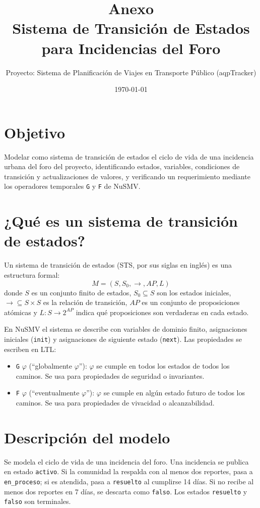 \documentclass[11pt,a4paper]{article}
\title{\textbf{Anexo}\\[2mm]
\large Sistema de Transición de Estados para Incidencias del Foro}
\author{Proyecto: Sistema de Planificación de Viajes en Transporte Público (aqpTracker)}
\date{\today}
\begin{document}
\maketitle

\section{Objetivo}

Modelar como sistema de transición de estados el ciclo de vida de una incidencia urbana del foro del proyecto, identificando estados, variables, condiciones de transición y actualizaciones de valores, y verificando un requerimiento mediante los operadores temporales \texttt{G} y \texttt{F} de NuSMV.

\section{¿Qué es un sistema de transición de estados?}

Un sistema de transición de estados (STS, por sus siglas en inglés) es una estructura formal:
\[
M = (S, S_0, \rightarrow, AP, L)
\]
donde \(S\) es un conjunto finito de estados, \(S_0 \subseteq S\) son los estados iniciales, \(\rightarrow \subseteq S \times S\) es la relación de transición, \(AP\) es un conjunto de proposiciones atómicas y \(L : S \rightarrow 2^{AP}\) indica qué proposiciones son verdaderas en cada estado.

En NuSMV el sistema se describe con variables de dominio finito, asignaciones iniciales (\texttt{init}) y asignaciones de siguiente estado (\texttt{next}). Las propiedades se escriben en LTL:
\begin{itemize}
  \item \texttt{G} \(\varphi\) (``globalmente \(\varphi\)''): \(\varphi\) se cumple en todos los estados de todos los caminos. Se usa para propiedades de seguridad o invariantes.
  \item \texttt{F} \(\varphi\) (``eventualmente \(\varphi\)''): \(\varphi\) se cumple en algún estado futuro de todos los caminos. Se usa para propiedades de vivacidad o alcanzabilidad.
\end{itemize}

\section{Descripción del modelo}

Se modela el ciclo de vida de una incidencia del foro. Una incidencia se publica en estado \texttt{activo}. Si la comunidad la respalda con al menos dos reportes, pasa a \texttt{en\_proceso}; si es atendida, pasa a \texttt{resuelto} al cumplirse 14 días. Si no recibe al menos dos reportes en 7 días, se descarta como \texttt{falso}. Los estados \texttt{resuelto} y \texttt{falso} son terminales.
\end{document}
